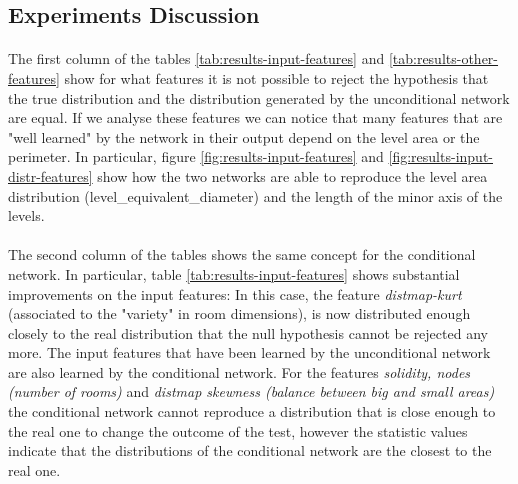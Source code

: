 \subsection{Experiments Discussion}
\paragraph{} The first column of the tables \ref{tab:results-input-features} and \ref{tab:results-other-features} show for what features it is not possible to reject the hypothesis that the true distribution and the distribution generated by the unconditional network are equal. If we analyse these features we can notice that many features that are "well learned" by the network in their output depend on the level area or the perimeter. In particular, figure \ref{fig:results-input-features} and \ref{fig:results-input-distr-features} show how the two networks are able to reproduce the level area distribution (level\_equivalent\_diameter) and the length of the minor axis of the levels. 

\paragraph{} The second column of the tables shows the same concept for the conditional network. In particular, table \ref{tab:results-input-features} shows substantial improvements on the input features: In this case, the feature  \textit{distmap-kurt} (associated to the "variety" in room dimensions), is now distributed enough closely to the real distribution that the null hypothesis cannot be rejected any more. The input features that have been learned by the unconditional network are also learned by the conditional network. For the features \textit{solidity, nodes (number of rooms)} and \textit{distmap skewness (balance between big and small areas)} the conditional network cannot reproduce a distribution that is close enough to the real one to change the outcome of the test, however the statistic values indicate that the distributions of the conditional network are the closest to the real one.

